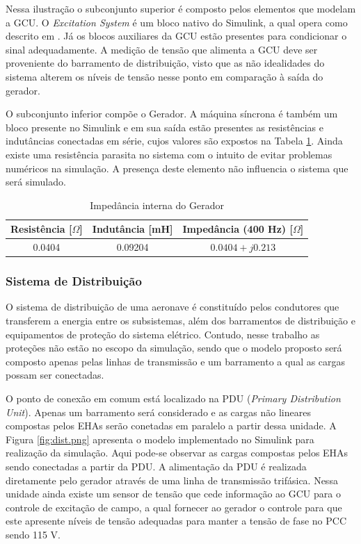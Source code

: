 Nessa ilustração o subconjunto superior é composto pelos elementos que modelam a GCU. O \textit{Excitation System} é um bloco nativo do Simulink, a qual opera como descrito em \cite{IEEE}. Já os blocos auxiliares da GCU estão presentes para condicionar o sinal adequadamente. A medição de tensão que alimenta a GCU deve ser proveniente do barramento de distribuição, visto que as não idealidades do sistema alterem os níveis de tensão nesse ponto em comparação à saída do gerador.

O subconjunto inferior compõe o Gerador. A máquina síncrona é também um bloco presente no Simulink e em sua saída estão presentes as resistências e indutâncias conectadas em série, cujos valores são expostos na Tabela \ref{tab:Zgen}.  Ainda existe uma resistência parasita no sistema com o intuito de evitar problemas numéricos na simulação. A presença deste elemento não influencia o sistema que será simulado.

\begin{table}[!htb]
	\centering
	\begin{tabular}{|c|c|c|}
		\hline
		\textbf{Resistência	[$\Omega$]}	& \textbf{Indutância [mH]}	& \textbf{Impedância (400 Hz) [$\Omega$]}\\\hline
		0.0404					& 0.09204			& $0.0404+j0.213$\\
		\hline
	\end{tabular}
	\caption{Impedância interna do Gerador}
	\label{tab:Zgen}
\end{table}

\subsubsection{Sistema de Distribuição}

O sistema de distribuição de uma aeronave é constituído pelos condutores que transferem a energia entre os subsistemas, além dos barramentos de distribuição e equipamentos de proteção do sistema elétrico. Contudo, nesse trabalho as proteções não estão no escopo da simulação, sendo que o modelo proposto será composto apenas pelas linhas de transmissão e um barramento a qual as cargas possam ser conectadas.

O ponto de conexão em comum está localizado na PDU (\textit{Primary Distribution Unit}). Apenas um barramento será considerado e as cargas não lineares compostas pelos EHAs serão conetadas em paralelo a partir dessa unidade. A Figura \ref{fig:dist.png} apresenta o modelo implementado no Simulink para realização da simulação. Aqui pode-se observar as cargas compostas pelos EHAs sendo conectadas a partir da PDU. A alimentação da PDU é realizada diretamente pelo gerador através de uma linha de transmissão trifásica. Nessa unidade ainda existe um sensor de tensão que cede informação ao GCU para o controle de excitação de campo, a qual fornecer ao gerador o controle para que este apresente níveis de tensão adequadas para manter a tensão de fase no PCC sendo 115 V.

